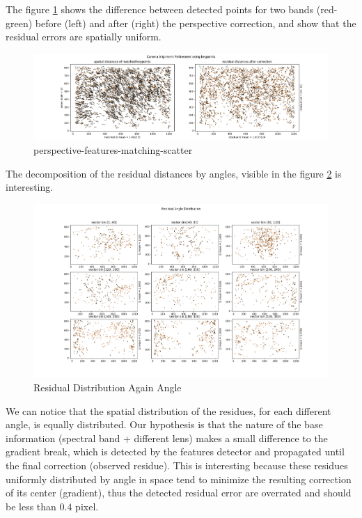 \documentclass[]{elsarticle}
\begin{document}
	\par The figure \ref{fig:perspective-features-matching-scatter} shows the difference between detected points for two bands (red-green)
	before (left) and after (right) the perspective correction, and show that the residual errors are spatially uniform.
	
	\begin{figure}[H]
		\centering
		\includegraphics[width=\linewidth]{../figures/perspective-features-matching-scatter.png}
		\caption{perspective-features-matching-scatter}
		\label{fig:perspective-features-matching-scatter}
	\end{figure}
	
	\newpage
	\par The decomposition of the residual distances by angles, visible in the figure \ref{fig:residual-angle} is interesting.
	
	\begin{figure}[H]
		\centering
		\includegraphics[width=\linewidth]{../figures/perspective-features-residual.png}
		\caption{Residual Distribution Again Angle}
		\label{fig:residual-angle}
	\end{figure}

	We can notice that the spatial distribution of the residues, for each different angle, is equally distributed.
	Our hypothesis is that the nature of the base information (spectral band + different lens) makes a small difference to the gradient break,
	which is detected by the features detector and propagated until the final correction (observed residue).
	This is interesting because these residues uniformly distributed by angle in space tend to minimize the resulting correction of its center (gradient),
	thus the detected residual error are overrated and should be less than $0.4$ pixel.
\end{document}
